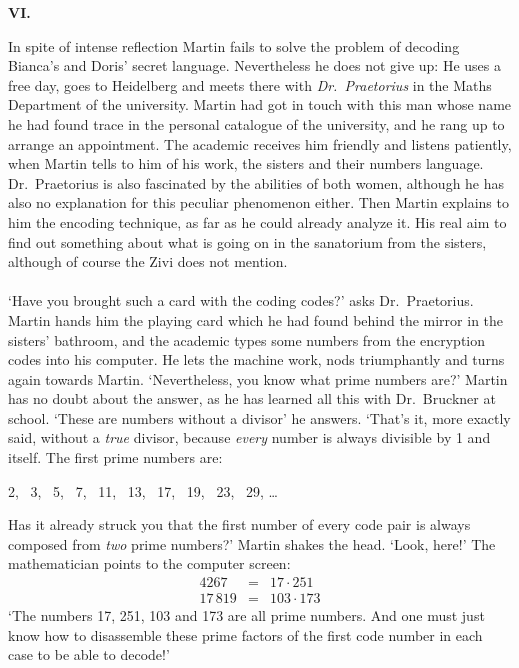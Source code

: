 \begin{center} 
{\bf VI.} 
\end{center} 
In spite of intense reflection Martin fails to solve the problem of decoding Bianca's and Doris' secret language. 
Nevertheless he does not give up: He uses a free day, goes to Heidelberg and meets there with {\em Dr.~Praetorius\/} 
in the Maths Department of the university. 
Martin had got in touch with this man whose name he had found trace in the personal catalogue of the university, 
and he rang up to arrange an appointment. 
The academic receives him friendly and listens patiently, when Martin tells to him of his work, the sisters and 
their numbers language.
Dr.~Praetorius is also fascinated by the abilities of both women, although he has also no explanation for this 
peculiar phenomenon either.
Then Martin explains to him the encoding technique, as far as he could already analyze it.
His real aim to find out something about what is going on in the sanatorium from the sisters, although of course 
the Zivi does not mention. \\ \\ 
`Have you brought such a card with the coding codes?' asks Dr.~Praetorius. 
Martin hands him the playing card which he had found behind the mirror in the sisters' bathroom, and the academic 
types some numbers from the encryption codes into his computer. 
He lets the machine work, nods triumphantly and turns again towards Martin.
`Nevertheless, you know what prime numbers are?' 
Martin has no doubt about the answer, as he has learned all this with Dr.~Bruckner at school. 
`These are numbers without a divisor' he answers. `That's it, more exactly said, without a {\em true\/} divisor, 
because {\em every\/} number is always divisible by 1 and itself. 
The first prime numbers are:
\begin{center} 
2, \, 3, \, 5, \, 7, \, 11, \, 13, \, 17, \, 19, \, 23, \, 29, \quad 
\dots 
\end{center} 
Has it already struck you that the first number of every code pair is always composed from {\em two\/} prime numbers?'
Martin shakes the head. 
`Look, here!' 
The mathematician points to the computer screen: 
\[\begin{array}{rcc}
4267 & = & 17\cdot 251 \\
17\,819 & = & 103\cdot 173
\end{array} \]
`The numbers 17, 251, 103 and 173 are all prime numbers. 
And one must just know how to disassemble these prime factors of the first code number in each case to be able to decode!' 
